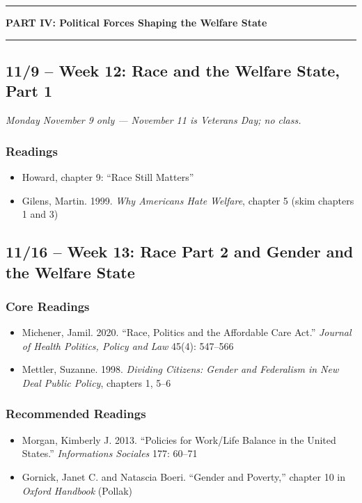 \documentclass[12pt]{article}
\begin{document}
\bigskip
\noindent\rule{\textwidth}{0.6pt}
\begin{center}\textbf{PART IV: Political Forces Shaping the Welfare State}\end{center}
\noindent\rule{\textwidth}{0.6pt}

\subsection*{11/9 -- Week 12: Race and the Welfare State, Part 1}
\emph{Monday November 9 only --- November 11 is Veterans Day; no class.}
    \subsubsection*{Readings}
        \begin{itemize}
            \item Howard, chapter 9: ``Race Still Matters''
            \item Gilens, Martin. 1999. \emph{Why Americans Hate Welfare}, chapter 5 (skim chapters 1 and 3)
        \end{itemize}

\subsection*{11/16 -- Week 13: Race Part 2 and Gender and the Welfare State}
    \subsubsection*{Core Readings}
        \begin{itemize}
            \item Michener, Jamil. 2020. ``Race, Politics and the Affordable Care Act.'' \emph{Journal of Health Politics, Policy and Law} 45(4): 547--566
            \item Mettler, Suzanne. 1998. \emph{Dividing Citizens: Gender and Federalism in New Deal Public Policy}, chapters 1, 5--6
        \end{itemize}
    \subsubsection*{Recommended Readings}
        \begin{itemize}
            \item Morgan, Kimberly J. 2013. ``Policies for Work/Life Balance in the United States.'' \emph{Informations Sociales} 177: 60--71
            \item Gornick, Janet C. and Natascia Boeri. ``Gender and Poverty,'' chapter 10 in \emph{Oxford Handbook} (Pollak)
        \end{itemize}
\end{document}
